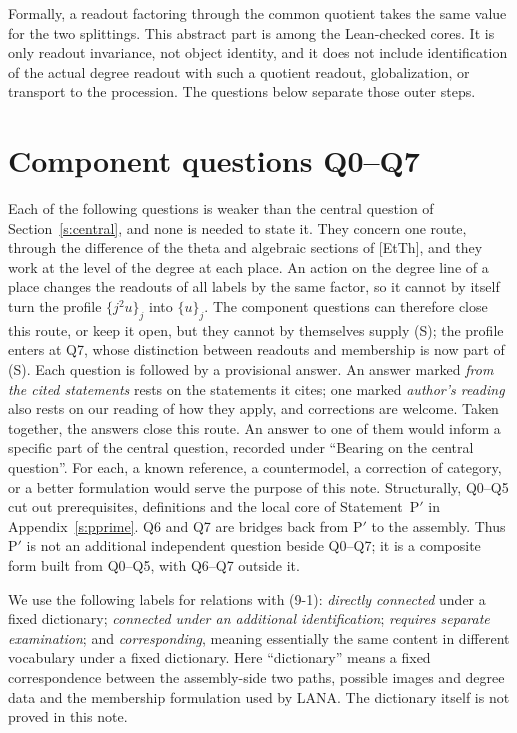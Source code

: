 \documentclass[11pt]{article}
\theoremstyle{definition}
\begin{document}
Formally, a readout factoring through the common quotient takes
the same value for the two splittings.  This abstract part is
among the Lean-checked cores.  It is only readout invariance, not
object identity, and it does not include identification of the
actual degree readout with such a quotient readout,
globalization, or transport to the procession.  The questions
below separate those outer steps.

\section{Component questions Q0--Q7}\label{s:questions}

Each of the following questions is weaker than the central
question of Section~\ref{s:central}, and none is needed to state
it.  They concern one route, through the difference of the theta and
algebraic sections of [EtTh], and they work at the level of the
degree at each place.  An action on the degree line of a place
changes the readouts of all labels by the same factor, so it cannot
by itself turn the profile $\{j^2u\}_j$ into $\{u\}_j$.  The component
questions can therefore close this route, or keep it open, but they
cannot by themselves supply (S); the profile enters at Q7, whose
distinction between readouts and membership is now part of (S).
Each question is followed by a provisional answer.  An answer marked
\emph{from the cited statements} rests on the statements it cites;
one marked \emph{author's reading} also rests on our reading of how
they apply, and corrections are welcome.  Taken together, the answers
close this route.
An answer to one of them would inform a specific part of the
central question, recorded under ``Bearing on the central
question''.  For each, a known reference, a countermodel, a
correction of category, or a better formulation would serve the
purpose of this note.  Structurally, Q0--Q5 cut out prerequisites,
definitions and the local core of Statement~P$'$ in
Appendix~\ref{s:pprime}.  Q6 and Q7 are bridges back from P$'$ to
the assembly.  Thus P$'$ is not an additional independent question
beside Q0--Q7; it is a composite form built from Q0--Q5, with
Q6--Q7 outside it.

We use the following labels for relations with (9-1):
\emph{directly connected} under a fixed dictionary; \emph{connected
under an additional identification}; \emph{requires separate
examination}; and \emph{corresponding}, meaning essentially the
same content in different vocabulary under a fixed dictionary.
Here ``dictionary'' means a fixed correspondence between the
assembly-side two paths, possible images and degree data and the
membership formulation used by LANA.  The dictionary itself is
not proved in this note.
\end{document}
